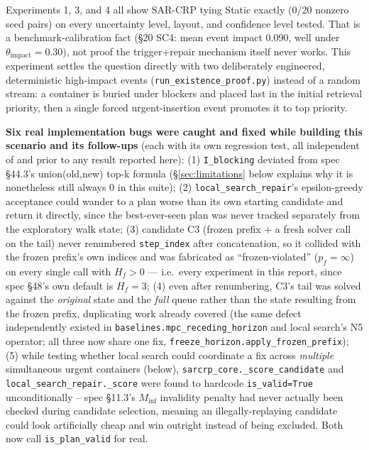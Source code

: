 \documentclass[11pt]{article}
\begin{document}
Experiments 1, 3, and 4 all show SAR-CRP tying Static exactly (0/20
nonzero seed pairs) on every uncertainty level, layout, and confidence
level tested. That is a benchmark-calibration fact (\S20 SC4: mean event
impact 0.090, well under $\theta_{\text{impact}}=0.30$), not proof the
trigger+repair mechanism itself never works. This experiment settles the
question directly with two deliberately engineered, deterministic
high-impact events (\texttt{run\_existence\_proof.py}) instead of a random
stream: a container is buried under blockers and placed last in the
initial retrieval priority, then a single forced urgent-insertion event
promotes it to top priority.

\textbf{Six real implementation bugs were caught and fixed while building
this scenario and its follow-ups} (each with its own regression test, all
independent of and prior to any result reported here): (1) \texttt{I\_blocking}
deviated from spec \S44.3's union(old,new) top-k formula (\S\ref{sec:limitations} below
explains why it is nonetheless still always 0 in this suite); (2)
\texttt{local\_search\_repair}'s epsilon-greedy acceptance could wander to
a plan worse than its own starting candidate and return it directly, since
the best-ever-seen plan was never tracked separately from the exploratory
walk state; (3) candidate C3 (frozen prefix + a fresh solver call on the
tail) never renumbered \texttt{step\_index} after concatenation, so it
collided with the frozen prefix's own indices and was fabricated as
``frozen-violated'' ($p_f=\infty$) on every single call with $H_f>0$ ---
i.e.\ every experiment in this report, since spec \S48's own default is
$H_f=3$; (4) even after renumbering, C3's tail was solved against the
\emph{original} state and the \emph{full} queue rather than the state
resulting from the frozen prefix, duplicating work already covered (the
same defect independently existed in \texttt{baselines.mpc\_receding\_horizon}
and local search's N5 operator; all three now share one fix,
\texttt{freeze\_horizon.apply\_frozen\_prefix}); (5) while testing whether
local search could coordinate a fix across \emph{multiple} simultaneous
urgent containers (below), \texttt{sarcrp\_core.\_score\_candidate} and
\texttt{local\_search\_repair.\_score} were found to hardcode
\texttt{is\_valid=True} unconditionally -- spec \S11.3's $M_{\mathrm{inf}}$
invalidity penalty had never actually been checked during candidate
selection, meaning an illegally-replaying candidate could look
artificially cheap and win outright instead of being excluded. Both now
call \texttt{is\_plan\_valid} for real.
\end{document}
